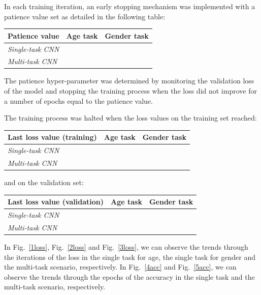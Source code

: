 In each training iteration, an early stopping mechanism was implemented with
a patience value set as detailed in the following table:
\begin{table}[H]
    \centering
    \begin{tabular}{@{}lll@{}}
    \toprule
    Patience value           & \textbf{Age task} & \textbf{Gender task} \\ \midrule
    \textit{Single-task CNN} &                   &                      \\
    \textit{Multi-task CNN}  &                   &                      \\ \bottomrule
    \end{tabular}
\end{table}

The patience hyper-parameter was determined by monitoring the validation loss
of the model and stopping the training process when the loss
did not improve for a number of epochs equal to the patience value.

The training process was halted when the loss values
on the training set reached: 
\begin{table}[H]
    \centering
    \begin{tabular}{@{}lll@{}}
    \toprule
    Last loss value (training) & \textbf{Age task} & \textbf{Gender task} \\ \midrule
    \textit{Single-task CNN} &                   &                      \\
    \textit{Multi-task CNN}  &                   &                      \\ \bottomrule
    \end{tabular}
\end{table}
and on the validation set:
\begin{table}[H]
    \centering
    \begin{tabular}{@{}lll@{}}
    \toprule
    Last loss value (validation) & \textbf{Age task} & \textbf{Gender task} \\ \midrule
    \textit{Single-task CNN} &                   &                      \\
    \textit{Multi-task CNN}  &                   &                      \\ \bottomrule
    \end{tabular}
\end{table}

In Fig.~\ref{1loss}, Fig.~\ref{2loss} and Fig.~\ref{3loss},
we can observe the trends through the iterations
of the loss
in the single task for age, the single task for gender
and the multi-task scenario, respectively.
In Fig.~\ref{4acc} and Fig.~\ref{5acc}, we can observe the
trends through the epochs of the accuracy
in the single task
and the multi-task scenario, respectively.

